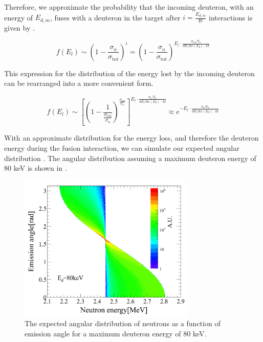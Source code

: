 Therefore, we approximate the probability that the incoming deuteron, with an energy of $E_{d, m}$, fuses with a deuteron in the target after $i = \frac{E_{d, m}}{W}$ interactions is given by .

\begin{equation}
        \label{eqn:nerix_minitron_energy_loss_1}
        f(E_l) \sim \left( 1 - \frac{\sigma_n}{\sigma_{\textrm{tot}}} \right)^i = \left( 1 - \frac{\sigma_n}{\sigma_{\textrm{tot}}} \right)^{E_l \cdot \frac{\sigma_{\textrm{tot}} N_a}{dE / dx(E_d) \cdot M}}
\end{equation}

This expression for the distribution of the energy lost by the incoming deuteron can be rearranged into a more convenient form.

\begin{equation}
        \label{eqn:nerix_minitron_energy_loss_2}
         f(E_l) \sim \left[ \left( 1 - \frac{1}{\frac{\sigma_{\textrm{tot}}}{\sigma_n}} \right)^{\frac{\sigma_{\textrm{tot}}}{\sigma_n}} \right] ^{E_l \cdot \frac{\sigma_n N_a}{dE / dx(E_d) \cdot M}} \approx e^{-E_l \cdot \frac{\sigma_n N_a}{dE / dx(E_d) \cdot M}}
\end{equation}

With an approximate distribution for the energy loss, and therefore the deuteron energy during the fusion interaction, we can simulate our expected angular distribution \cite{chadwick2011endf, guillaume_thesis}.  The angular distribution assuming a maximum deuteron energy of 80 keV is shown in .

\begin{figure}[t]
        \centering
	\includegraphics[width=0.75\textwidth]{nerix_yield_emission_angle}
	\caption{The expected angular distribution of neutrons as a function of emission angle for a maximum deuteron energy of 80 keV.}
	\label{fig:nerix_yield_emission_angle}
\end{figure}





